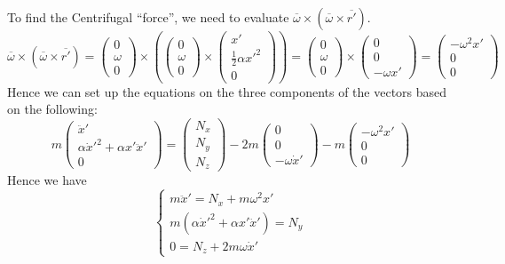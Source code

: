 \documentclass[a4paper,12pt,titlepage]{article}
\begin{document}
To find the Centrifugal ``force'', we need to evaluate $\overline\omega\times(\overline\omega\times\overline{r'})$.
\[\overline\omega\times(\overline\omega\times\overline{r'})=\left(\begin{matrix}0\\\omega\\0\end{matrix}\right)\times\left(\left(\begin{matrix}0\\\omega\\0\end{matrix}\right)\times\left(\begin{matrix}x'\\\frac{1}{2}\alpha x'^2\\0\end{matrix}\right)\right)=\left(\begin{matrix}0\\\omega\\0\end{matrix}\right)\times\left(\begin{matrix}0\\0\\-\omega x'\end{matrix}\right)=\left(\begin{matrix}-\omega^2 x'\\0\\0\end{matrix}\right)\]
Hence we can set up the equations on the three components of the vectors based on the following:
\[m\left(\begin{matrix}\ddot x'\\\alpha\dot x'^2+\alpha x'\ddot x'\\0\end{matrix}\right)=\left(\begin{matrix}N_x\\N_y\\N_z\end{matrix}\right)-2m\left(\begin{matrix}0\\0\\-\omega\dot x'\end{matrix}\right)-m\left(\begin{matrix}-\omega^2 x'\\0\\0\end{matrix}\right)\]
Hence we have
\[\begin{cases}
m\ddot x'=N_x+m\omega^2 x'\\
m(\alpha\dot x'^2+\alpha x'\ddot x')=N_y\\
0=N_z+2m\omega\dot x'
\end{cases}\]
\end{document}
